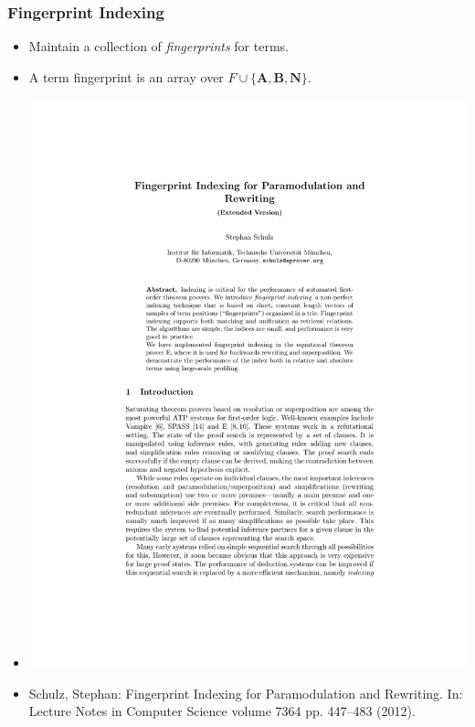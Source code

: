 \documentclass[10pt]{beamer}
\begin{document}
\begin{frame}
  \frametitle{Fingerprint Indexing}
  \begin{itemize}
  \item<1-> Maintain a collection of \emph{fingerprints} for terms.
  \item<2-> A term fingerprint is an array over $F \cup \{\mathbf{A, B, N}\}$.
  \item<3-> \includegraphics[page=6,scale=0.7,trim=5.5cm 20.5cm 5cm 4cm,clip]{schulz_fp-index_ext}
  \item<4-> {\footnotesize Schulz, Stephan: Fingerprint Indexing for Paramodulation and Rewriting. In:
  Lecture Notes in Computer Science volume 7364 pp. 447--483 (2012).}

  \end{itemize}
\end{frame}
\end{document}

